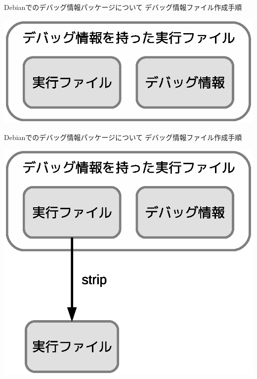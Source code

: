\begin{frame}{Debianでのデバッグ情報パッケージについて}
デバッグ情報ファイル作成手順
\begin{center}
\includegraphics[width=1.0\hsize]{image2012-gum/ddebug-gum-image-data-debug-data00.eps}
\end{center}
\end{frame}

\begin{frame}{Debianでのデバッグ情報パッケージについて}
デバッグ情報ファイル作成手順
\begin{center}
\includegraphics[width=1.0\hsize]{image2012-gum/ddebug-gum-image-data-debug-data01.eps}
\end{center}
\end{frame}

